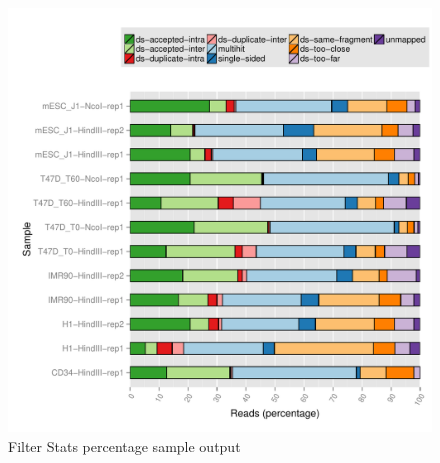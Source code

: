 \begin{figure}[!htb]
    \centering
    \includegraphics[width=\textwidth,height=\textheight,keepaspectratio]{figure/filter-stats_percent}
    \caption{Filter Stats percentage sample output} %
    \label{fig:filter-stats-percent}
\end{figure}
\clearpage